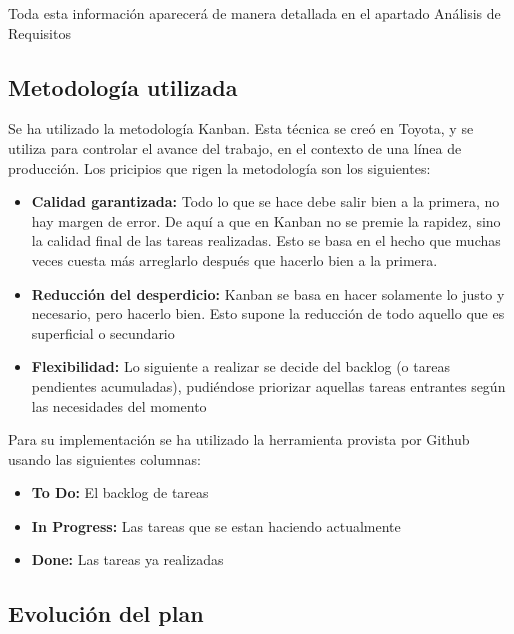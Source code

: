 \documentclass[openright,twoside,10pt]{book}
\begin{document}
    Toda esta información aparecerá de manera detallada en el apartado
    Análisis de Requisitos
    
    \subsection{Metodología utilizada}\label{metodologuxeda-utilizada}
    
    Se ha utilizado la metodología Kanban. Esta técnica se creó en Toyota, y
    se utiliza para controlar el avance del trabajo, en el contexto de una
    línea de producción. Los pricipios que rigen la metodología son los
    siguientes:
    
    \begin{itemize}
    \item
      \textbf{Calidad garantizada:} Todo lo que se hace debe salir bien a la
      primera, no hay margen de error. De aquí a que en Kanban no se premie
      la rapidez, sino la calidad final de las tareas realizadas. Esto se
      basa en el hecho que muchas veces cuesta más arreglarlo después que
      hacerlo bien a la primera.
    \item
      \textbf{Reducción del desperdicio:} Kanban se basa en hacer solamente
      lo justo y necesario, pero hacerlo bien. Esto supone la reducción de
      todo aquello que es superficial o secundario
    \item
      \textbf{Flexibilidad:} Lo siguiente a realizar se decide del backlog
      (o tareas pendientes acumuladas), pudiéndose priorizar aquellas tareas
      entrantes según las necesidades del momento
    \end{itemize}
    
    Para su implementación se ha utilizado la herramienta provista por
    Github usando las siguientes columnas:
    
    \begin{itemize}
    \item
      \textbf{To Do:} El backlog de tareas
    \item
      \textbf{In Progress:} Las tareas que se estan haciendo actualmente
    \item
      \textbf{Done:} Las tareas ya realizadas
    \end{itemize}
    
    \subsection{Evolución del plan}\label{evoluciuxf3n-del-plan}
    
\end{document}
